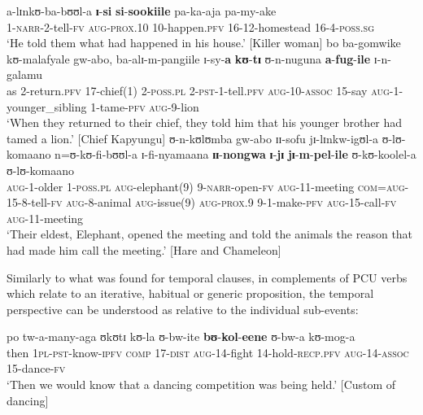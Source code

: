 \begin{exe}
\ex \label{exSpeechReport1} \gll a-lɪnkʊ-ba-bʊʊl-a \textbf{ɪ}-\textbf{si} \textbf{si}-\textbf{sookiile} pa-ka-aja pa-my-ake\\
1-\textsc{narr}-2-tell-\textsc{fv} \textsc{aug}-\textsc{prox.10} 10-happen.\textsc{pfv} 16-12-homestead 16-4-\textsc{poss.sg}\\
\glt \lq He told them what had happened in his house.' [Killer woman]
\ex \label{exSpeechReport2} \gll bo ba-gomwike kʊ-malafyale gw-abo, ba-alɪ-m-pangiile ɪ-sy-\textbf{a} \textbf{kʊ}-\textbf{tɪ} ʊ-n-nuguna \textbf{a}-\textbf{fug}-\textbf{ile} ɪ-n-galamu\\
as 2-return.\textsc{pfv} 17-chief(1) 2-\textsc{poss.pl} 2-\textsc{pst}-1-tell.\textsc{pfv} \textsc{aug}-10-\textsc{assoc} 15-say \textsc{aug}-1-younger\_sibling 1-tame-\textsc{pfv} \textsc{aug}-9-lion\\
\glt `When they returned to their chief, they told him that his younger brother had tamed a lion.' [Chief Kapyungu]
\ex \label{exSpeechReport3}
\gll ʊ-n-kʊlʊmba gw-abo ɪɪ-sofu jɪ-lɪnkw-igʊl-a ʊ-lʊ-komaano n=ʊ-kʊ-fi-bʊʊl-a ɪ-fi-nyamaana \textbf{ɪɪ}-\textbf{nongwa} \textbf{ɪ}-\textbf{jɪ} \textbf{jɪ}-\textbf{m}-\textbf{pel}-\textbf{ile} ʊ-kʊ-koolel-a ʊ-lʊ-komaano\\
\textsc{aug}-1-older 1-\textsc{poss.pl} \textsc{aug}-elephant(9) 9-\textsc{narr}-open-\textsc{fv} \textsc{aug}-11-meeting \textsc{com}=\textsc{aug}-15-8-tell-\textsc{fv} \textsc{aug}-8-animal \textsc{aug}-issue(9) \textsc{aug}-\textsc{prox.9} 9-1-make-\textsc{pfv} \textsc{aug}-15-call-\textsc{fv} \textsc{aug}-11-meeting\\
\sn \lq Their eldest, Elephant, opened the meeting and told the animals the reason that had made him call the meeting.' [Hare and Chameleon]
\end{exe}

Similarly to what was found for temporal clauses, in complements of PCU verbs which relate to an iterative, habitual or generic proposition, the temporal perspective can be understood as relative to the individual sub-events:

\begin{exe}
\ex \gll po tw-a-many-aga ʊkʊtɪ kʊ-la ʊ-bw-ite \textbf{bʊ}-\textbf{kol}-\textbf{eene} ʊ-bw-a kʊ-mog-a\\
then \textsc{1pl}-\textsc{pst}-know-\textsc{ipfv} \textsc{comp} 17-\textsc{dist} \textsc{aug}-14-fight 14-hold-\textsc{recp.pfv} \textsc{aug}-14-\textsc{assoc} 15-dance-\textsc{fv}\\
\glt \lq Then we would know that a dancing competition was being held.' [Custom of dancing]
\end{exe}
